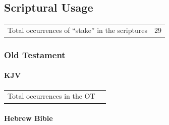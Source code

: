 
\subsection{Scriptural Usage} %
	\label{STAKE-SCRIPTURES}
	
	\begin{tabular}{ll}
		Total occurrences of ``stake'' in the scriptures & 29 \\
	\end{tabular}

	\subsubsection{Old Testament} %
		\label{STAKE-OT}
	
		\paragraph{KJV}
			\label{STAKE-OT-KJV}
	
			\begin{tabular}{ll}
				Total occurrences in the OT & 
			\end{tabular}
			
			\begin{compactdesc}
				\item[{\hyperref[ISAIAH-33-20]{Isaiah 33:20}}]
				\item[{\hyperref[ISAIAH-54-2]{Isaiah 54:2}}]
			\end{compactdesc}
			
		\paragraph{Hebrew Bible}
			\label{STAKE-HEBREW}
		
			\subparagraph{\texorpdfstring{}{}} %
				\label{YATED} %
			
